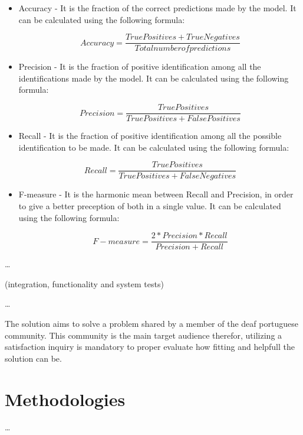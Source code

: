 \begin{itemize}
    \item Accuracy - It is the fraction of the correct predictions made by the model.
    It can be calculated using the following formula:

    \begin{equation}
    Accuracy = \frac{True Positives + True Negatives}{Total number of predictions}
    \label{eqn:Accuracy}
    \end{equation}

    \item Precision - It is the fraction of positive identification among all the identifications made by the model.
    It can be calculated using the following formula:
    
    \begin{equation}
    Precision = \frac{True Positives}{True Positives + False Positives}
    \label{eqn:Precision}
    \end{equation}

    \item Recall - It is the fraction of positive identification among all the possible identification to be made.
    It can be calculated using the following formula:
    
    \begin{equation}
    Recall = \frac{True Positives}{True Positives + False Negatives}
    \label{eqn:Recall}
    \end{equation}

    \item F-measure - It is the harmonic mean between Recall and Precision, in order to give a better preception of both in a single value.
    It can be calculated using the following formula:
    
    \begin{equation}
    F-measure = \frac{2*{Precision}*{Recall}}{Precision + Recall}
    \label{eqn:F-measure}
    \end{equation}

\end{itemize}

\dots

(integration, functionality and system tests)

\dots

The solution aims to solve a problem shared by a member of the deaf portuguese community.
This community is the main target audience therefor, utilizing a satisfaction inquiry is mandatory to proper evaluate how fitting and helpfull the solution can be.  

\section{Methodologies}

\dots
